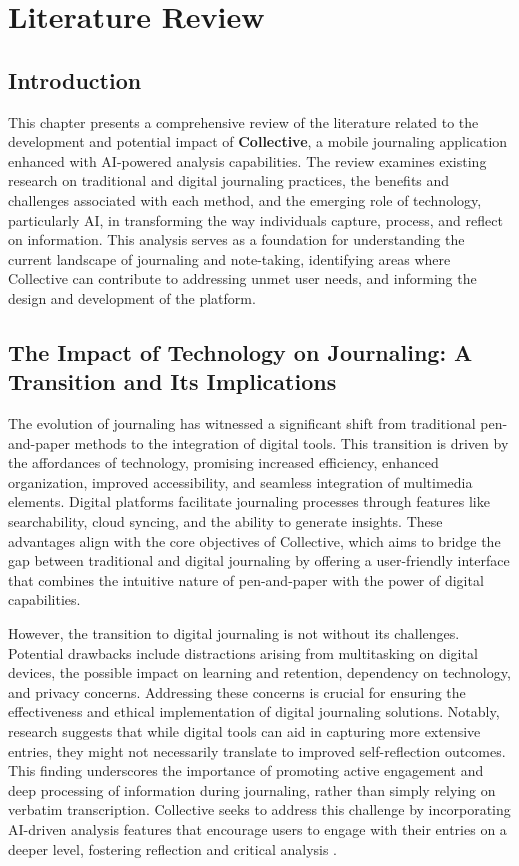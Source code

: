 \chapter{Literature Review}\label{ch:literature}

\section{Introduction}\label{sec:intro}

This chapter presents a comprehensive review of the literature related to the development and potential impact of \textbf{Collective}, a mobile journaling application enhanced with AI-powered analysis capabilities. The review examines existing research on traditional and digital journaling practices, the benefits and challenges associated with each method, and the emerging role of technology, particularly AI, in transforming the way individuals capture, process, and reflect on information. This analysis serves as a foundation for understanding the current landscape of journaling and note-taking, identifying areas where Collective can contribute to addressing unmet user needs, and informing the design and development of the platform.

\section{The Impact of Technology on Journaling: A Transition and Its Implications}\label{sec:technology-impact}

The evolution of journaling has witnessed a significant shift from traditional pen-and-paper methods to the integration of digital tools. This transition is driven by the affordances of technology, promising increased efficiency, enhanced organization, improved accessibility, and seamless integration of multimedia elements. Digital platforms facilitate journaling processes through features like searchability, cloud syncing, and the ability to generate insights. These advantages align with the core objectives of Collective, which aims to bridge the gap between traditional and digital journaling by offering a user-friendly interface that combines the intuitive nature of pen-and-paper with the power of digital capabilities.

However, the transition to digital journaling is not without its challenges. Potential drawbacks include distractions arising from multitasking on digital devices, the possible impact on learning and retention, dependency on technology, and privacy concerns. Addressing these concerns is crucial for ensuring the effectiveness and ethical implementation of digital journaling solutions. Notably, research suggests that while digital tools can aid in capturing more extensive entries, they might not necessarily translate to improved self-reflection outcomes. This finding underscores the importance of promoting active engagement and deep processing of information during journaling, rather than simply relying on verbatim transcription. Collective seeks to address this challenge by incorporating AI-driven analysis features that encourage users to engage with their entries on a deeper level, fostering reflection and critical analysis \cite{baikadi2016exploring}.

